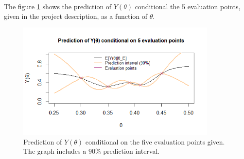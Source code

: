 The figure \ref{2afiveeval} shows the prediction of $Y(\theta)$ conditional the 5 evaluation points, given in the project description, as a function of $\theta$. 

\begin{figure}
    \centering
    \includegraphics[width=100mm]{2anew.png}
    \caption{Prediction of $Y(\theta)$ conditional on the five evaluation points given. The graph includes a $90\%$ prediction interval. }
    \label{2afiveeval}
\end{figure}


